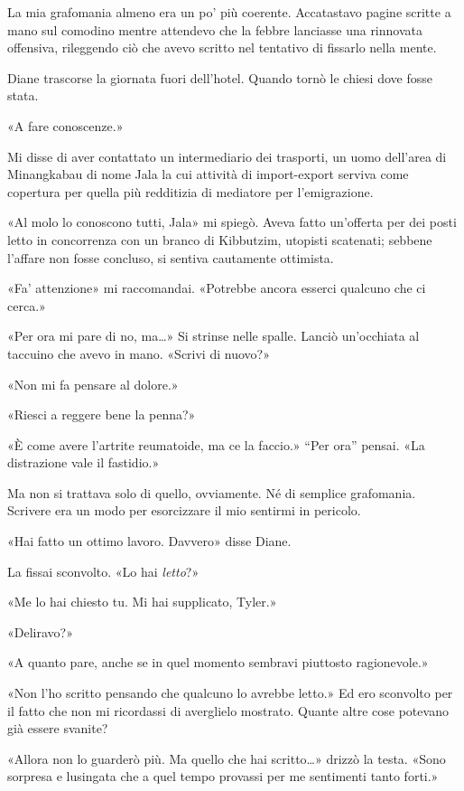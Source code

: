 La mia grafomania almeno era un po' più coerente. Accatastavo pagine
scritte a mano sul comodino mentre attendevo che la febbre lanciasse una
rinnovata offensiva, rileggendo ciò che avevo scritto nel tentativo di
fissarlo nella mente.

Diane trascorse la giornata fuori dell'hotel. Quando tornò le chiesi
dove fosse stata.

«A fare conoscenze.»

Mi disse di aver contattato un intermediario dei trasporti, un uomo
dell'area di Minangkabau di nome Jala la cui attività di import-export
serviva come copertura per quella più redditizia di mediatore per
l'emigrazione.

«Al molo lo conoscono tutti, Jala» mi spiegò. Aveva fatto un'offerta per
dei posti letto in concorrenza con un branco di Kibbutzim, utopisti
scatenati; sebbene l'affare non fosse concluso, si sentiva cautamente
ottimista.

«Fa' attenzione» mi raccomandai. «Potrebbe ancora esserci qualcuno che
ci cerca.»

«Per ora mi pare di no, ma\ldots» Si strinse nelle spalle. Lanciò
un'occhiata al taccuino che avevo in mano. «Scrivi di nuovo?»

«Non mi fa pensare al dolore.»

«Riesci a reggere bene la penna?»

«È come avere l'artrite reumatoide, ma ce la faccio.» ``Per ora''
pensai. «La distrazione vale il fastidio.»

Ma non si trattava solo di quello, ovviamente. Né di semplice
grafomania. Scrivere era un modo per esorcizzare il mio sentirmi in
pericolo.

«Hai fatto un ottimo lavoro. Davvero» disse Diane.

La fissai sconvolto. «Lo hai \emph{letto}?»

«Me lo hai chiesto tu. Mi hai supplicato, Tyler.»

«Deliravo?»

«A quanto pare, anche se in quel momento sembravi piuttosto
ragionevole.»

«Non l'ho scritto pensando che qualcuno lo avrebbe letto.» Ed ero
sconvolto per il fatto che non mi ricordassi di averglielo mostrato.
Quante altre cose potevano già essere svanite?

«Allora non lo guarderò più. Ma quello che hai scritto\ldots» drizzò la
testa. «Sono sorpresa e lusingata che a quel tempo provassi per me
sentimenti tanto forti.»

